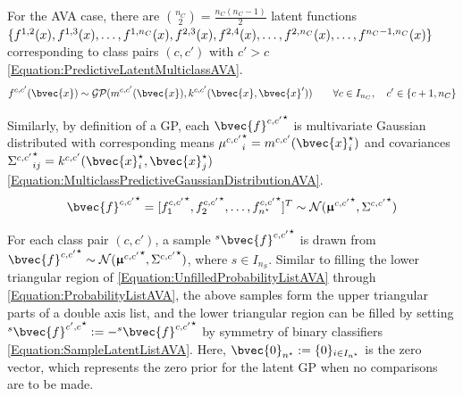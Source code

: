 				For the AVA case, there are ${n_{C} \choose 2} = \frac{n_{C} (n_{C} - 1)}{2}$ latent functions $\{f^{1, 2}(x), f^{1, 3}(x), \dots, \\ f^{1, n_{C}}(x), f^{2, 3}(x), f^{2, 4}(x), \dots, f^{2, n_{C}}(x), \dots, f^{n_{C} - 1, n_{C}}(x)\}$ corresponding to class pairs $(c, c')$ with $c' > c$ \eqref{Equation:PredictiveLatentMulticlassAVA}. \begin{equation}
					f^{c, c'}(\bvec{x}) \sim \mathcal{GP}(m^{c, c'}(\bvec{x}), k^{c, c'}(\bvec{x}, \bvec{x}')) \qquad \forall c \in I_{n_{C}}, \quad c' \in \{c + 1, n_{C}\}
				\label{Equation:PredictiveLatentMulticlassAVA}
				\end{equation}
			
				Similarly, by definition of a GP, each ${\bvec{f}^{c, c'}}^{\star}$ is multivariate Gaussian distributed with corresponding means ${\mu^{c, c'}}^{\star}_{i} = m^{c, c'}(\bvec{x}^{\star}_{i})$ and covariances ${\Sigma^{c, c'}}^{\star}_{ij} = k^{c, c'}(\bvec{x}^{\star}_{i}, \bvec{x}^{\star}_{j})$ \eqref{Equation:MulticlassPredictiveGaussianDistributionAVA}. \begin{equation}
					{\bvec{f}^{c, c'}}^{\star} = [{f^{c, c'}_{1}}^{\star}, {f^{c, c'}_{2}}^{\star}, \dots, {f^{c, c'}_{n^{\star}}}^{\star}]^{T} \sim \mathcal{N}({\vec{\upmu}^{c, c'}}^{\star}, {\Sigma^{c, c'}}^{\star})
				\label{Equation:MulticlassPredictiveGaussianDistributionAVA}
				\end{equation}
				
				For each class pair $(c, c')$, a sample ${^{s}}{\bvec{f}^{c, c'}}^{\star}$ is drawn from ${\bvec{f}^{c, c'}}^{\star} \sim \mathcal{N}({\vec{\upmu}^{c, c'}}^{\star}, {\Sigma^{c, c'}}^{\star})$, where $s \in I_{n_{S}}$. Similar to filling the lower triangular region of \eqref{Equation:UnfilledProbabilityListAVA} through \ref{Equation:ProbabilityListAVA}, the above samples form the upper triangular parts of a double axis list, and the lower triangular region can be filled by setting ${^{s}}{\bvec{f}^{c', c}}^{\star} := -{^{s}}{\bvec{f}^{c, c'}}^{\star}$ by symmetry of binary classifiers \ref{Equation:SampleLatentListAVA}. Here, $\bvec{0}_{n^{\star}} := \{0\}_{i \in I_{n^{\star}}}$ is the zero vector, which represents the zero prior for the latent GP when no comparisons are to be made.
				
